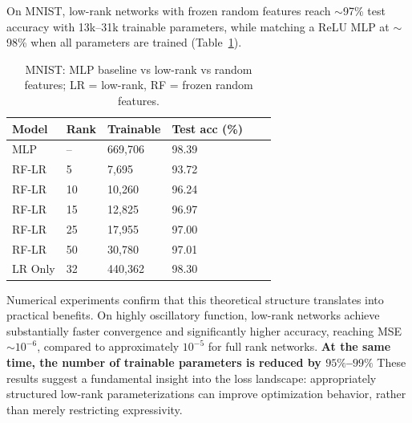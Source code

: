 \documentclass[nohyperref]{article}
\theoremstyle{plain}
\theoremstyle{definition}
\theoremstyle{remark}
\begin{document}



On MNIST, low-rank networks with frozen random features reach $\sim$97\% test accuracy with 13k--31k trainable parameters, 
while matching a ReLU MLP at $\sim$98\% when all parameters are trained (Table~\ref{tab:mnist}).


\begin{table}[htbp]
\centering
\caption{MNIST: MLP baseline vs low-rank vs random features; LR = low-rank, RF = frozen random features.}
\label{tab:mnist}
\begin{tabular}{llllrr}
\toprule
Model & Rank & Trainable & Test acc (\%)  \\
\midrule
MLP & -- & 669,706 & 98.39  \\
RF-LR & 5  & 7,695    & 93.72  \\
RF-LR & 10 & 10,260   & 96.24  \\
RF-LR & 15 & 12,825   & 96.97  \\
RF-LR & 25 & 17,955   & 97.00  \\
RF-LR & 50 & 30,780   & 97.01  \\
LR Only & 32 & 440,362  & 98.30  \\
\bottomrule
\end{tabular}
\end{table}

Numerical experiments confirm that this theoretical structure translates into
practical benefits.
On highly oscillatory function, low-rank networks achieve
substantially faster convergence and significantly higher accuracy, reaching
MSE $\sim 10^{-6}$, compared to approximately $10^{-5}$ for full rank networks.
\textbf{At the same time, the number of trainable parameters is reduced by
$95\%$--$99\%$}
These results suggest a fundamental insight into the loss landscape:
appropriately structured low-rank parameterizations can improve optimization
behavior, rather than merely restricting expressivity.
\end{document}
